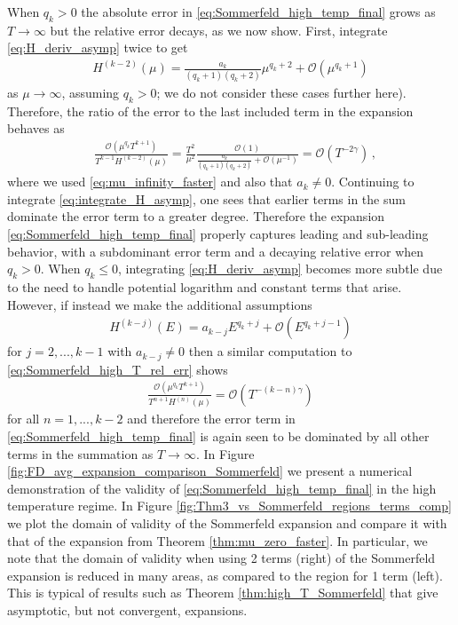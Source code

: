 \documentclass[sn-mathphys,Numbered]{sn-jnl}
\begin{document}
When $q_k>0$ the absolute error in \eqref{eq:Sommerfeld_high_temp_final}  grows as $T\to\infty$ but the relative error decays, as we now show.  First, integrate \eqref{eq:H_deriv_asymp} twice to get
\begin{align}\label{eq:integrate_H_asymp}
    H^{(k-2)}(\mu)=\frac{a_k}{(q_k+1)(q_k+2)}\mu^{q_k+2}+\mathcal{O}(\mu^{q_k+1})
\end{align}
as $\mu\to\infty$, assuming $q_k>0$; we do not consider these cases further here). Therefore, the ratio of the error to the last included term in the expansion behaves as
\begin{align}\label{eq:Sommerfeld_high_T_rel_err}
&\frac{\mathcal{O}(\mu^{q_k}T^{k+1})}{ T^{k-1} H^{(k-2)}(\mu)}=\frac{T^2}{\mu^2}\frac{\mathcal{O}(1)}{ \frac{a_k}{(q_k+1)(q_k+2)}+\mathcal{O}(\mu^{-1})}= \mathcal{O}(T^{-2\gamma})\,,
\end{align}
where we used \eqref{eq:mu_infinity_faster} and also that $a_k\neq 0$. Continuing to integrate \eqref{eq:integrate_H_asymp}, one sees that earlier terms in the sum dominate the error term to a  greater degree.  Therefore the expansion \eqref{eq:Sommerfeld_high_temp_final} properly  captures leading and sub-leading behavior, with a subdominant error term and a decaying relative error when $q_k>0$. When $q_k\leq 0$, integrating \eqref{eq:H_deriv_asymp} becomes more subtle due to the need to handle potential logarithm and constant terms that arise.  However, if instead we make the additional assumptions 
\begin{align}
H^{(k-j)}(E)=a_{k-j} E^{q_k+j} +\mathcal{O}(E^{q_k+j-1})
\end{align}
for $j=2,...,k-1$ with $a_{k-j}\neq 0$ then a similar computation to \eqref{eq:Sommerfeld_high_T_rel_err} shows
\begin{align}
    \frac{\mathcal{O}(\mu^{q_k}T^{k+1})}{T^{n+1}H^{(n)}(\mu)}= \mathcal{O}(T^{-(k-n)\gamma})
\end{align}
for all $n=1,...,k-2$ and therefore the error term in \eqref{eq:Sommerfeld_high_temp_final} is again seen to be dominated by all other terms in the summation as $T\to\infty$. In Figure \ref{fig:FD_avg_expansion_comparison_Sommerfeld} we present a  numerical demonstration of the validity of \eqref{eq:Sommerfeld_high_temp_final} in the high temperature regime. In   Figure \ref{fig:Thm3_vs_Sommerfeld_regions_terms_comp} we plot the domain of validity of the  Sommerfeld expansion  and compare it with that of the expansion from Theorem \ref{thm:mu_zero_faster}.  In particular, we note that the domain of validity when using 2 terms (right) of the Sommerfeld expansion is reduced in many areas, as compared to the region for 1 term (left). This is typical of results such as Theorem \ref{thm:high_T_Sommerfeld} that give asymptotic, but not convergent, expansions.
\end{document}
